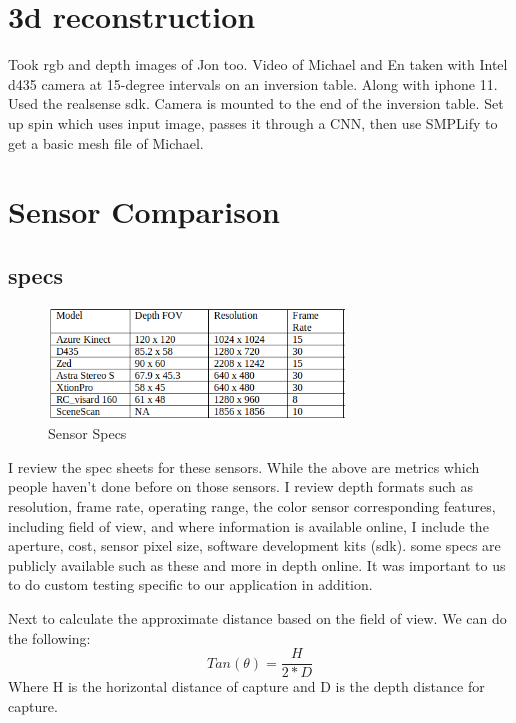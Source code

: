 \section{3d reconstruction}
Took rgb and depth images of Jon too. Video of Michael and En taken with Intel d435 camera at 15-degree intervals on an inversion table. Along with iphone 11. Used the realsense sdk. Camera is mounted to the end of the inversion table. Set up spin which uses input image, passes it through a CNN, then use SMPLify to get a basic mesh file of Michael.
\section{Sensor Comparison}

\subsection{specs}
\begin{figure}[h]
	\caption{Sensor Specs}
	\centering
	\includegraphics[width=0.7\textwidth, angle=0]{images/sensor_specs.png}
\end{figure}
I review the spec sheets for these sensors. While the above are metrics which people haven't done before on those sensors. I review depth formats such as resolution, frame rate, operating range, the color sensor corresponding features, including field of view, and where information is available online, I include the aperture, cost, sensor pixel size, software development kits (sdk).
some specs are publicly available such as these and more in depth online. It was important to us to do custom testing specific to our application in addition.

Next to calculate the approximate distance based on the field of view. We can do the following:
\begin{equation}
	Tan(\theta) = \frac{H}{2 * D}
\end{equation}
Where H is the horizontal distance of capture and D is the depth distance for capture.
